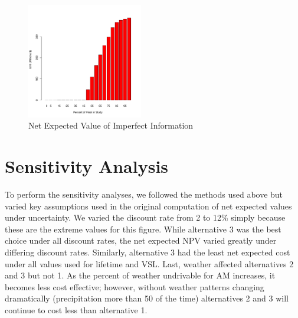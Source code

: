 \documentclass[11pt, letterpaper]{article}
\begin{document}
\begin{figure}[h]
\centering
\includegraphics[width=0.45\textwidth]{../../R/alt3Barplot.pdf}
\caption{Net Expected Value of Imperfect Information}
\label{fig:evii}
\end{figure}



\section{Sensitivity Analysis} \label{sensitivity}

To perform the sensitivity analyses, we followed the methods used
above but varied key assumptions used in the original computation of
net expected values under uncertainty.  We varied the discount rate
from 2 to 12\% simply because these are the extreme values for this
figure.  While alternative 3 was the best choice under all discount
rates, the net expected NPV varied greatly under differing discount
rates. Similarly, alternative 3 had the least net expected cost under
all values used for lifetime and VSL.  Last, weather affected
alternatives 2 and 3 but not 1.  As the percent of weather
undrivable for AM increases, it becomes less cost effective; however,
without  weather patterns changing dramatically (precipitation more
than 50 of the time) alternatives 2 and 3 will continue to cost less
than alternative 1.
\end{document}
